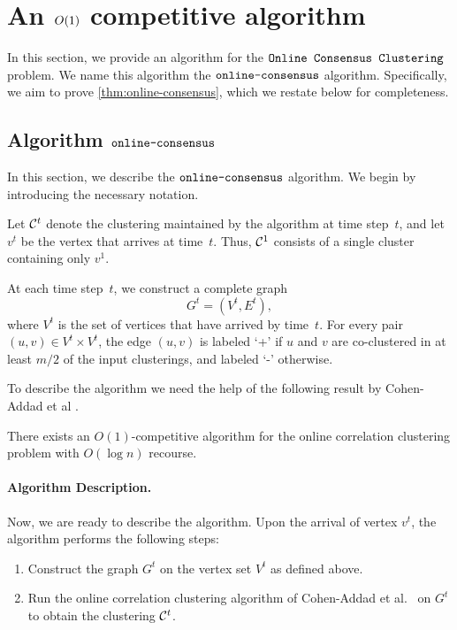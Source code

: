 \section{An $O(1)$ competitive algorithm}
In this section, we provide an algorithm for the $\texttt{Online Consensus Clustering}$ problem. We name this algorithm the $\texttt{online-consensus}$ algorithm. Specifically, we aim to prove \cref{thm:online-consensus}, which we restate below for completeness. 



\subsection{Algorithm $\texttt{online-consensus}$}

In this section, we describe the $\texttt{online-consensus}$ algorithm.
We begin by introducing the necessary notation.

Let $\mathcal{C}^t$ denote the clustering maintained by the algorithm at time step~$t$, and let $v^t$ be the vertex that arrives at time~$t$.
Thus, $\mathcal{C}^1$ consists of a single cluster containing only $v^1$.

At each time step~$t$, we construct a complete graph 
\[
    G^t = (V^t, E^t),
\]
where $V^t$ is the set of vertices that have arrived by time~$t$.
For every pair $(u,v) \in V^t \times V^t$, the edge $(u,v)$ is labeled `+' if $u$ and $v$ are co-clustered in at least $m/2$ of the input clusterings, and labeled `-' otherwise.

To describe the algorithm we need the help of the following result by Cohen-Addad et al \cite{cohen2022online}.

\begin{lemma}\cite{cohen2022online}
\label{lem:cohen}
    There exists an $O(1)$-competitive algorithm for the online correlation clustering problem with $O(\log n)$ recourse.
\end{lemma}

\paragraph{Algorithm Description.}
Now, we are ready to describe the algorithm. Upon the arrival of vertex $v^t$, the algorithm performs the following steps:

\begin{enumerate}
    \item Construct the graph $G^t$ on the vertex set $V^t$ as defined above.
    
    \item Run the online correlation clustering algorithm of Cohen-Addad et al.~\cite{cohen2022online} on $G^t$ to obtain the clustering $\mathcal{C}^t$.
\end{enumerate}


